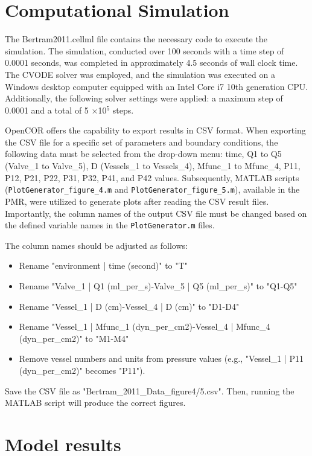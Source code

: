 \documentclass[fleqn,10pt]{physiome}
\begin{document}
\section{Computational Simulation}

The Bertram2011.cellml file contains the necessary code to execute the simulation. The simulation, conducted over 100 seconds with a time step of 0.0001 seconds, was completed in approximately 4.5 seconds of wall clock time. The CVODE solver was employed, and the simulation was executed on a Windows desktop computer equipped with an Intel Core i7 10th generation CPU. Additionally, the following solver settings were applied: a maximum step of 0.0001 and a total of 5 $\times$10$^{5}$ steps.


OpenCOR offers the capability to export results in CSV format. When exporting the CSV file for a specific set of parameters and boundary conditions, the following data must be selected from the drop-down menu: time, Q1 to Q5 (Valve\_1 to Valve\_5), D (Vessels\_1 to Vessels\_4), Mfunc\_1 to Mfunc\_4, P11, P12, P21, P22, P31, P32, P41, and P42 values. Subsequently, MATLAB scripts (\texttt{PlotGenerator\_figure\_4.m} and \texttt{PlotGenerator\_figure\_5.m}), available in the PMR, were utilized to generate plots after reading the CSV result files. Importantly, the column names of the output CSV file must be changed based on the defined variable names in the \texttt{PlotGenerator.m} files.

The column names should be adjusted as follows:
\begin{itemize}
    \item Rename "environment | time (second)" to "T"
    \item Rename "Valve\_1 | Q1 (ml\_per\_s)-Valve\_5 | Q5 (ml\_per\_s)" to "Q1-Q5"
     \item Rename "Vessel\_1 | D (cm)-Vessel\_4 | D (cm)" to "D1-D4"
    \item Rename "Vessel\_1 | Mfunc\_1 (dyn\_per\_cm2)-Vessel\_4 | Mfunc\_4 (dyn\_per\_cm2)" to "M1-M4"
    \item Remove vessel numbers and units from pressure values (e.g., "Vessel\_1 | P11 (dyn\_per\_cm2)" becomes "P11").
\end{itemize}

Save the CSV file as "Bertram\_2011\_Data\_figure4/5.csv". Then, running the MATLAB script will produce the correct figures.



\section{Model results}
\end{document}
